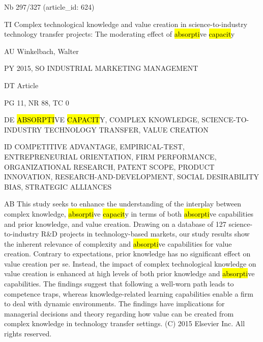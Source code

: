\documentclass[a4paper]{article}
\begin{document}
\vspace*{-2cm}
Nb \tabto{0cm}297/327 (article\_id: 624)\par
TI \tabto{0cm}Complex technological knowledge and value creation in science-to-industry technology transfer projects: The moderating effect of \hl{absorpti}ve \hl{capacit}y\par
AU \tabto{0cm}Winkelbach, Walter\par
PY \tabto{0cm}2015, SO INDUSTRIAL MARKETING MANAGEMENT\par
DT \tabto{0cm}Article\par
PG \tabto{0cm}11, NR 88, TC 0\par
DE \tabto{0cm}\hl{ABSORPTI}VE \hl{CAPACIT}Y, COMPLEX KNOWLEDGE, SCIENCE-TO-INDUSTRY TECHNOLOGY TRANSFER, VALUE CREATION\par
ID \tabto{0cm}COMPETITIVE ADVANTAGE, EMPIRICAL-TEST, ENTREPRENEURIAL ORIENTATION, FIRM PERFORMANCE, ORGANIZATIONAL RESEARCH, PATENT SCOPE, PRODUCT INNOVATION, RESEARCH-AND-DEVELOPMENT, SOCIAL DESIRABILITY BIAS, STRATEGIC ALLIANCES\par
AB \tabto{0cm}This study seeks to enhance the understanding of the interplay between complex knowledge, \hl{absorpti}ve \hl{capacit}y in terms of both \hl{absorpti}ve capabilities and prior knowledge, and value creation. Drawing on a database of 127 science-to-industry R\&D projects in technology-based markets, our study results show the inherent relevance of complexity and \hl{absorpti}ve capabilities for value creation. Contrary to expectations, prior knowledge has no significant effect on value creation per se. Instead, the impact of complex technological knowledge on value creation is enhanced at high levels of both prior knowledge and \hl{absorpti}ve capabilities. The findings suggest that following a well-worn path leads to competence traps, whereas knowledge-related learning capabilities enable a firm to deal with dynamic environments. The findings have implications for managerial decisions and theory regarding how value can be created from complex knowledge in technology transfer settings. (C) 2015 Elsevier Inc. All rights reserved.\par
\clearpage
\end{document}

